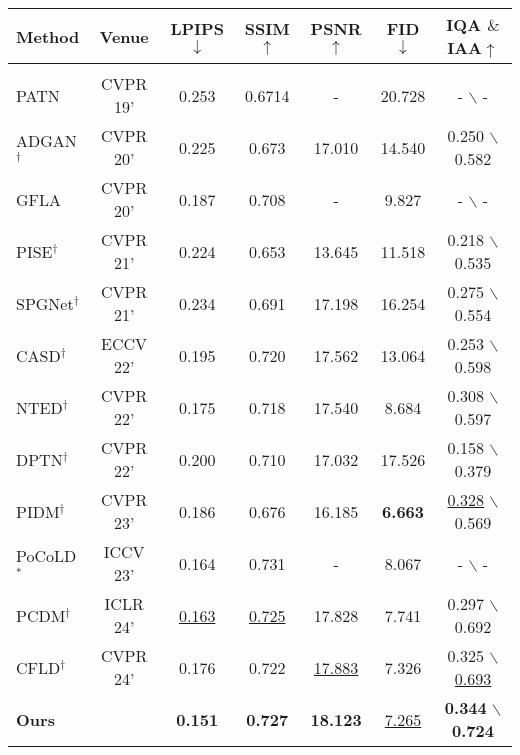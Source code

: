 
\begin{tabular}{l| c| c| c| c| c| c}
    \toprule
         \textbf{Method} & \textbf{Venue} & \textbf{LPIPS$\downarrow$} & \textbf{SSIM$\uparrow$} & \textbf{PSNR$\uparrow$} & \textbf{FID$\downarrow$} & \textbf{IQA $\&$ IAA$\uparrow$}   \\
    \midrule
        \rowcolor{gray!20}
            \multicolumn{7}{l}{\textit{DeepFashion (256 $\times$ 176)}} \\
             PATN\cite{zhu2019progressive} & CVPR 19' & 0.253 & 0.6714 & - & 20.728 & - $\backslash$ - \\
             ADGAN$^\dagger$\cite{men2020controllable} & CVPR 20' & 0.225 & 0.673& 17.010 & 14.540 & 0.250 $\backslash$ 0.582\\
             GFLA\cite{ren2020deep} & CVPR 20' & 0.187 & 0.708& - & 9.827 & - $\backslash$ - \\
             PISE$^\dagger$\cite{zhang2021pise} & CVPR 21' & 0.224 & 0.653& 13.645 & 11.518 & 0.218 $\backslash$ 0.535\\
             SPGNet$^\dagger$\cite{lv2021learning} & CVPR 21' & 0.234 & 0.691& 17.198 & 16.254  & 0.275 $\backslash$ 0.554\\
             CASD$^\dagger$\cite{zhou2022cross} & ECCV 22' & 0.195 & 0.720 & 17.562 & 13.064 & 0.253 $\backslash$ 0.598 \\
             NTED$^\dagger$\cite{ren2022neural} & CVPR 22' & 0.175 & 0.718 & 17.540 & 8.684 & 0.308 $\backslash$ 0.597\\
             DPTN$^\dagger$\cite{zhang2022exploring} & CVPR 22' & 0.200 & 0.710 & 17.032 & 17.526 & 0.158 $\backslash$ 0.379 \\
             PIDM$^\dagger$ \cite{bhunia2023person} & CVPR 23' & 0.186 & 0.676 & 16.185 & \textbf{6.663} & \underline{0.328} $\backslash$ 0.569 \\
             \color{gray}PoCoLD$^\ast$\cite{han2023controllable} & \color{gray}ICCV 23' & \color{gray}0.164 & \color{gray}0.731 & - & \color{gray}8.067 & - $\backslash$ - \\
             PCDM$^\dagger$\cite{shen2024advancing} & ICLR 24' & \underline{0.163} & \underline{0.725} & 17.828 & 7.741 & 0.297 $\backslash$ 0.692\\   %
             CFLD$^\dagger$\cite{lu2024coarse} & CVPR 24' & 0.176 & 0.722 & \underline{17.883} & 7.326 & 0.325 $\backslash$ \underline{0.693} \\    %
             \textbf{Ours} &  & \textbf{0.151} & \textbf{0.727} & \textbf{18.123} & \underline{7.265} & \textbf{0.344} $\backslash$ \textbf{0.724}\\

\end{tabular}

